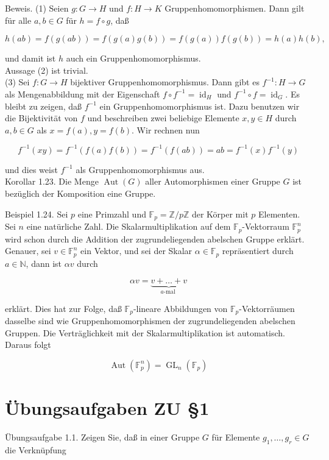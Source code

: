 \documentclass[10pt, letterpaper]{article}
\begin{document}
Beweis. (1) Seien $g: G \rightarrow H$ und $f: H \rightarrow K$ Gruppenhomomorphismen. Dann gilt für alle $a, b \in G$ für $h=f \circ g$, daß

$$
h(a b)=f(g(a b))=f(g(a) g(b))=f(g(a)) f(g(b))=h(a) h(b),
$$

und damit ist $h$ auch ein Gruppenhomomorphismus.\\
Aussage (2) ist trivial.\\
(3) Sei $f: G \rightarrow H$ bijektiver Gruppenhomomorphismus. Dann gibt es $f^{-1}: H \rightarrow G$ als Mengenabbildung mit der Eigenschaft $f \circ f^{-1}=\operatorname{id}_{H}$ und $f^{-1} \circ f=\operatorname{id}_{G}$. Es bleibt zu zeigen, daß $f^{-1}$ ein Gruppenhomomorphismus ist. Dazu benutzen wir die Bijektivität von $f$ und beschreiben zwei beliebige Elemente $x, y \in H$ durch $a, b \in G$ als $x=f(a), y=f(b)$. Wir rechnen nun

$$
f^{-1}(x y)=f^{-1}(f(a) f(b))=f^{-1}(f(a b))=a b=f^{-1}(x) f^{-1}(y)
$$

und dies weist $f^{-1}$ als Gruppenhomomorphismus aus.\\
Korollar 1.23. Die Menge $\operatorname{Aut}(G)$ aller Automorphismen einer Gruppe $G$ ist bezüglich der Komposition eine Gruppe.

Beispiel 1.24. Sei $p$ eine Primzahl und $\mathbb{F}_{p}=\mathbb{Z} / p \mathbb{Z}$ der Körper mit $p$ Elementen. Sei $n$ eine natürliche Zahl. Die Skalarmultiplikation auf dem $\mathbb{F}_{p}$-Vektorraum $\mathbb{F}_{p}^{n}$ wird schon durch die Addition der zugrundeliegenden abelschen Gruppe erklärt. Genauer, sei $v \in \mathbb{F}_{p}^{n}$ ein Vektor, und sei der Skalar $\alpha \in \mathbb{F}_{p}$ repräsentiert durch $a \in \mathbb{N}$, dann ist $\alpha v$ durch

$$
\alpha v=\underbrace{v+\ldots+v}_{a \text {-mal }}
$$

erklärt. Dies hat zur Folge, daß $\mathbb{F}_{p}$-lineare Abbildungen von $\mathbb{F}_{p}$-Vektorräumen dasselbe sind wie Gruppenhomomorphismen der zugrundeliegenden abelschen Gruppen. Die Verträglichkeit mit der Skalarmultiplikation ist automatisch. Daraus folgt

$$
\operatorname{Aut}\left(\mathbb{F}_{p}^{n}\right)=\operatorname{GL}_{n}\left(\mathbb{F}_{p}\right)
$$

\section*{Übungsaufgaben ZU §1}
Übungsaufgabe 1.1. Zeigen Sie, daß in einer Gruppe $G$ für Elemente $g_{1}, \ldots, g_{r} \in G$ die Verknüpfung
\end{document}
